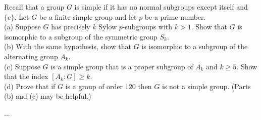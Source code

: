 \documentclass[12pt]{article}
\begin{document}
Recall that a group $G$ is simple if it has no normal
subgroups except itself and $\{e\}$.  Let $G$ be a finite
simple group and let $p$ be a prime number. \\[.05in]

(a) Suppose $G$ has precisely $k$ Sylow $p$-subgroups with
$k >1$. Show that $G$ is isomorphic to a subgroup of the
symmetric group $S_k$. \\[.05in]

(b) With the same hypothesis, show that $G$ is isomorphic
to a subgroup of the alternating group $A_k$. \\[.05in]

(c) Suppose $G$ is a simple group that is a proper
subgroup of $A_k$ and $k \geq 5$. Show that the index
$[A_k : G] \geq k$. \\[.05in]

(d) Prove that if $G$ is a group of order $120$ then $G$
is not a simple group. (Parts (b) and (c) may be helpful.)

...
\end{document}
